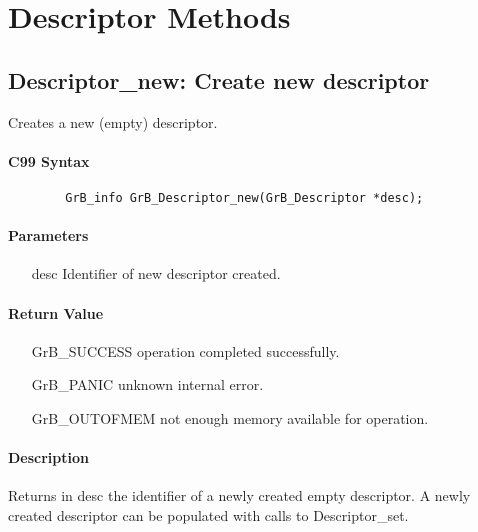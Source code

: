 \section{Descriptor Methods}

\subsection{{\sf Descriptor\_new}: Create new descriptor}

Creates a new (empty) descriptor.

\paragraph{C99 Syntax}

\begin{verbatim}
        GrB_info GrB_Descriptor_new(GrB_Descriptor *desc);
\end{verbatim}

\paragraph{Parameters}

\begin{itemize}[leftmargin=1.1in]
    \item[{\sf desc}] Identifier of new descriptor created.
\end{itemize}

\paragraph{Return Value}

\begin{itemize}[leftmargin=2.1in]
\item[{\sf GrB\_SUCCESS}]           operation completed successfully.
\item[{\sf GrB\_PANIC}]             unknown internal error.
\item[{\sf GrB\_OUTOFMEM}]          not enough memory available for operation.
\end{itemize}

\paragraph{Description}

Returns in {\sf desc} the identifier of a newly created empty descriptor.
A newly created descriptor can be populated with calls to {\sf
Descriptor\_set}.

